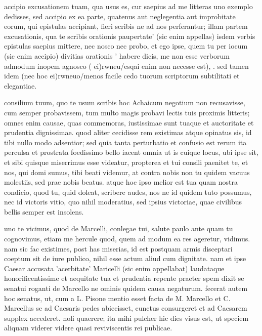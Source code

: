


 accipio excusationem tuam, qua usus es, cur saepius ad me litteras uno exemplo dedisses, sed accipio ex ea parte, quatenus aut neglegentia aut improbitate eorum, qui epistulas accipiant, fieri scribis ne ad nos perferantur; illam partem excusationis, qua te scribis orationis paupertate' (sic enim appellas) isdem verbis epistulas saepius mittere, nec nosco nec probo, et ego ipse, quem tu per iocum (sic enim accipio) divitias orationis ' habere dicis, me non esse verborum admodum inopem agnosco ( ei)rwneu/esqai enim non necesse est), . sed tamen idem (nec hoc ei)rwneuo/menos facile cedo tuorum scriptorum subtilitati et elegantiae.

 consilium tuum, quo te usum scribis hoc Achaicum negotium non recusavisse, cum semper probavissem, tum multo magis probavi lectis tuis proximis litteris; omnes enim causae, quas commemoras, iustissimae sunt tuaque et auctoritate et prudentia dignissimae. quod aliter cecidisse rem existimas atque opinatus sis, id tibi nullo modo adsentior; sed quia tanta perturbatio et confusio est rerum ita perculsa et prostrata foedissimo bello iacent omnia ut is cuique locus, ubi ipse sit, et sibi quisque miserrimus esse videatur, propterea et tui consili paenitet te, et nos, qui domi sumus, tibi beati videmur, at contra nobis non tu quidem vacuus molestiis, sed prae nobis beatus. atque hoc ipso melior est tua quam nostra condicio, quod tu, quid doleat, scribere audes, nos ne id quidem tuto possumus, nec id victoris vitio, quo nihil moderatius, sed ipsius victoriae, quae civilibus bellis semper est insolens.

 uno te vicimus, quod de Marcelli, conlegae tui, salute paulo ante quam tu cognovimus, etiam me hercule quod, quem ad modum ea res ageretur, vidimus. nam sic fac existimes, post has miserias, id est postquam armis disceptari coeptum sit de iure publico, nihil esse actum aliud cum dignitate. nam et ipse Caesar accusata 'acerbitate' Maricelli (sic enim appellabat) laudataque honorificentissime et aequitate tua et prudentia repente praeter spem dixit se senatui roganti de Marcello ne ominis quidem causa negaturum. fecerat autem hoc senatus, ut, cum a L. Pisone mentio esset facta de M. Marcello et C. Marcellus se ad Caesaris pedes abiecisset, cunctus consurgeret et ad Caesarem supplex accederet. noli quaerere; ita mihi pulcher hic dies visus est, ut speciem aliquam viderer videre quasi reviviscentis rei publicae.

